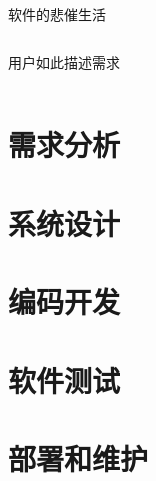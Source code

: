 \begin{frame}{软件的悲催生活}
\begin{columns}
{\begin{column}{.2\paperwidth}
\begin{center}
        \scriptsize 用户如此描述需求
      \end{center}
    \end{column}}
  \end{columns}
\end{frame}

\section{需求分析}

\section{系统设计}

\section{编码开发}

\section{软件测试}

\section{部署和维护}


